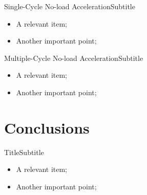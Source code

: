     \begin{frame}{Single-Cycle No-load Acceleration}{Subtitle}\vspace*{-2em}
        \begin{itemize}
            \item<2->  A \alert{relevant} item;
            \item<3->  Another \alert{important} point;
        \end{itemize}
    \end{frame}

    \begin{frame}{Multiple-Cycle No-load Acceleration}{Subtitle}\vspace*{-2em}
        \begin{itemize}
            \item<2->  A \alert{relevant} item;
            \item<3->  Another \alert{important} point;
        \end{itemize}
    \end{frame}

\section{Conclusions}

    \begin{frame}{Title}{Subtitle}\vspace*{-2em}
        \begin{itemize}
            \item<2->  A \alert{relevant} item;
            \item<3->  Another \alert{important} point;
        \end{itemize}
    \end{frame}

